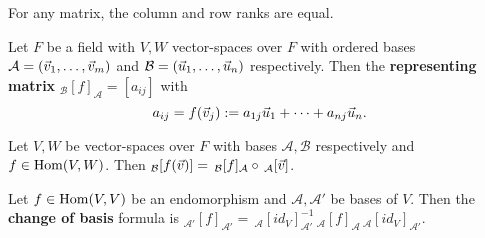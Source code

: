 \begin{multicols}{2}
\begin{theorem}[2.2.7]
For any matrix, the column and row ranks are equal.
\end{theorem}

\begin{definition}
Let $F$ be a field with $V,W$ vector-spaces over $F$ with ordered bases $\mathcal{A}=(\vec{v}_1,\dots,\vec{v}_m)$ and $\mathcal{B}=(\vec{u}_1,\dots,\vec{u}_n)$ respectively. Then the \textbf{representing matrix} $_\mathcal{B}[f]_\mathcal{A}=[a_{ij}]$ with
    \[
    a_{ij} = f(\vec{v}_j) := a_{1j}\vec{u}_1 + \dots + a_{nj}\vec{u}_n.
    \]
\end{definition}

\begin{theorem}[2.3.4]
Let $V,W$ be vector-spaces over $F$ with bases $\mathcal{A},\mathcal{B}$ respectively and $f\in\mathrm{Hom}(V,W)$. Then $_\mathcal{B}[f(\vec{v})]=\,_\mathcal{B}[f]_\mathcal{A} \circ\, _\mathcal{A}[\vec{v}]$.
\end{theorem}

\begin{theorem}[2.4.4]
Let $f\in\mathrm{Hom}(V,V)$ be an endomorphism and $\mathcal{A},\mathcal{A}'$ be bases of $V$. Then the \textbf{change of basis} formula is $_{\mathcal{A}'}[f]_{\mathcal{A}'} = \,_\mathcal{A}[id_V]^{-1}_{\mathcal{A}'}\,_\mathcal{A}[f]_\mathcal{A}\,_\mathcal{A}[id_V]_{\mathcal{A}'}$.
\end{theorem}
\end{multicols}